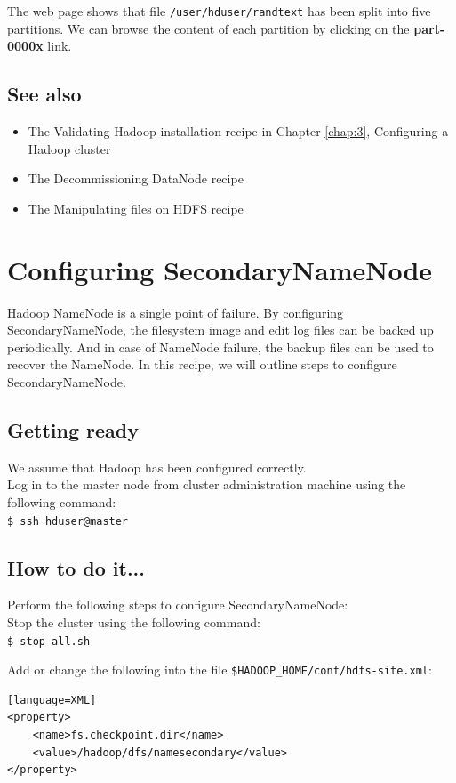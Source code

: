 The web page shows that file \verb|/user/hduser/randtext| has been split into five partitions. We can browse the content of each partition by clicking on the \textbf{part-0000x} link.
\subsection*{See also}
\begin{itemize}
  \item The Validating Hadoop installation recipe in Chapter \ref{chap:3}, Configuring a Hadoop cluster
  \item The Decommissioning DataNode recipe
  \item The Manipulating files on HDFS recipe
\end{itemize}

\section{Configuring SecondaryNameNode}
Hadoop NameNode is a single point of failure. By configuring SecondaryNameNode, the filesystem image and edit log files can be backed up periodically. And in case of NameNode failure, the backup files can be used to recover the NameNode. In this recipe, we will outline steps to configure SecondaryNameNode.
\subsection*{Getting ready}
We assume that Hadoop has been configured correctly.\\
Log in to the master node from cluster administration machine using the following command:\\
\verb|$ ssh hduser@master|

\subsection*{How to do it...}
Perform the following steps to configure SecondaryNameNode: \\
Stop the cluster using the following command: \\
\verb|$ stop-all.sh|

Add or change the following into the file \verb|$HADOOP_HOME/conf/hdfs-site.xml|: 
\begin{verbatim}[language=XML]
<property>
    <name>fs.checkpoint.dir</name>
    <value>/hadoop/dfs/namesecondary</value>
</property>
\end{verbatim}

